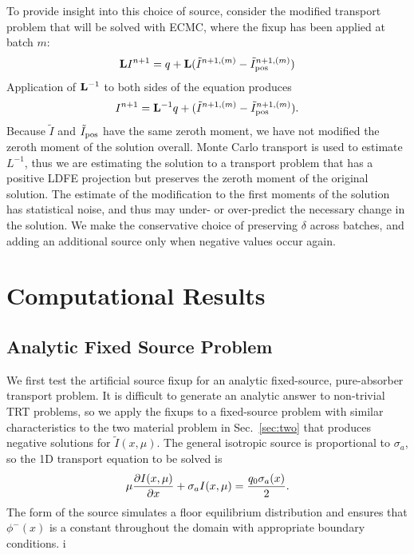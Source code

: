 To provide insight into this choice of source, consider the modified transport problem
that will be solved with ECMC, where the fixup has been applied at batch $m$:
\begin{equation}
   \mathbf{L} I^{n+1} = q + \mathbf{L}(\tilde{I}^{n+1,(m)} -
    \tilde{I}^{n+1,(m)}_{\text{pos}})
\end{equation}
Application of $\mathbf{L}^{-1}$ to both sides of the equation produces
\begin{equation}
    I^{n+1} = \mathbf{L}^{-1} q + (\tilde{I}^{n+1,(m)} -
    \tilde{I}^{n+1,(m)}_{\text{pos}}).
\end{equation}
Because $\tilde I$ and $\tilde I_{\text{pos}}$ have the same zeroth moment, we have not modified
the zeroth moment of the solution overall.  Monte Carlo transport is used to estimate $L^{-1}$, thus 
we are estimating the solution to a transport problem that has a positive LDFE projection but preserves the
zeroth moment of the original solution.  The estimate of the modification to the first
moments of the solution has statistical noise, and thus may under- or over-predict the
necessary change in the solution.  We make the conservative choice of preserving $\delta$
across batches, and adding an additional source only when negative values occur again. 

\section{Computational Results}

\subsection{Analytic Fixed Source Problem}

We first test the artificial source fixup for an analytic fixed-source, pure-absorber transport problem.  It is
difficult to generate an analytic answer to non-trivial TRT problems, so we apply the
fixups to a
fixed-source problem with similar characteristics to the two material problem in
Sec.~\ref{sec:two} that produces negative solutions for $\tilde I(x,\mu)$.  The general
isotropic source is proportional to $\sigma_a$, so the 1D transport equation to be solved is 
\begin{equation}\label{apptr}
    \mu \frac{\partial I(x,\mu)}{\partial x} + \sigma_a I(x,\mu) = \frac{q_0\sigma_a(x)}{2}.
\end{equation}
The form of the source simulates a floor equilibrium distribution and ensures that $\phi^-(x)$ is a
constant throughout the domain with appropriate boundary conditions. i

